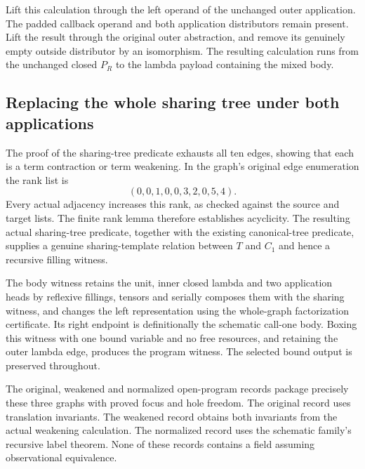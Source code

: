 Lift this calculation through the left operand of the unchanged outer
application. The padded callback operand and both application distributors
remain present. Lift the result through the original outer abstraction,
and remove its genuinely empty outside distributor by an isomorphism.
The resulting calculation runs from the unchanged closed $P_R$ to the
lambda payload containing the mixed body.

\subsection{Replacing the whole sharing tree under both applications}
The proof of the sharing-tree predicate exhausts all ten edges, showing that
each is a term contraction or term weakening. In the graph's original edge
enumeration the rank list is
\[
 (0,0,1,0,0,3,2,0,5,4).
\]
Every actual adjacency increases this rank, as checked against the source
and target lists. The finite rank lemma therefore establishes acyclicity.
The resulting actual sharing-tree predicate, together with the existing
canonical-tree predicate, supplies a genuine sharing-template relation
between $T$ and $C_1$ and hence a recursive filling witness.

The body witness retains the unit, inner closed lambda and two application
heads by reflexive fillings, tensors and serially composes them with the
sharing witness, and changes the left representation using the whole-graph
factorization certificate. Its right endpoint is definitionally the
schematic call-one body. Boxing this witness with one bound variable and
no free resources, and retaining the outer lambda edge, produces the
program witness. The selected bound output is preserved throughout.

The original, weakened and normalized open-program records package precisely
these three graphs with proved focus and hole freedom. The original record
uses translation invariants. The weakened record obtains both invariants
from the actual weakening calculation. The normalized record uses the
schematic family's recursive label theorem. None of these records contains
a field assuming observational equivalence.

